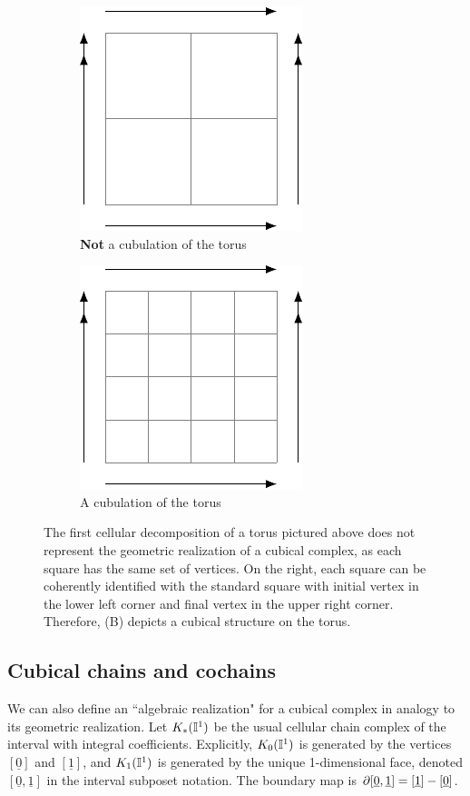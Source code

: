 \begin{figure}[h]
	\begin{subfigure}{.4\textwidth}
		\centering
		\includegraphics{figures/torus1.pdf}
		\caption{\textbf{Not} a cubulation of the torus}
	\end{subfigure}\qquad
	\begin{subfigure}{.4\textwidth}
		\centering
		\includegraphics{figures/torus2.pdf}
		\caption{A cubulation of the torus}
	\end{subfigure}
	\caption{The first cellular decomposition of a torus pictured above does not represent the geometric realization of a cubical complex, as each square has the same set of vertices. On the right, each square can be coherently identified with the standard square with initial vertex in the lower left corner and final vertex in the upper right corner. Therefore, (B) depicts a cubical structure on the torus.}
	\label{F: cubical structure}
\end{figure}


\subsection{Cubical chains and cochains}\label{S: cubical cochains}

We can also define an ``algebraic realization" for a cubical complex in analogy to its geometric realization.
Let $K_*(\mathbb{I}^1)$ be the usual cellular chain complex of the interval with integral coefficients.
Explicitly, $K_0(\mathbb{I}^1)$ is generated by the vertices $[\underline{0}]$ and $[\underline{1}]$, and $K_1(\mathbb{I}^1)$ is generated by the unique 1-dimensional face, denoted $[\underline{0},\underline{1}]$ in the interval subposet notation. The boundary map is $\partial [\underline{0},\underline{1}] = [\underline{1}]-[\underline{0}]$.

